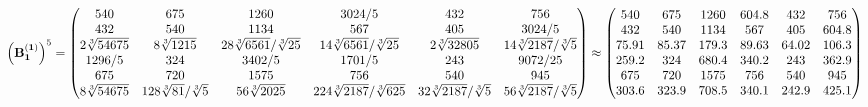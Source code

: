 \documentclass[10pt,a4paper]{article}
\begin{document}
	\[
		\left(\bold{B_1^{(1)}}\right)^{5} = 
		\begin{pmatrix}
			{{540}}{} & {{675}}{} & {{1260}}{} & {{3024}} / {{5}} & {{432}}{} & {{756}}{} \\
			{{432}}{} & {{540}}{} & {{1134}}{} & {{567}}{} & {{405}}{} & {{3024}} / {{5}} \\
			{{2}\sqrt[3]{54675}}{} & {{8}\sqrt[3]{1215}}{} & {{28}\sqrt[3]{6561}} / {\sqrt[3]{25}} & {{14}\sqrt[3]{6561}} / {\sqrt[3]{25}} & {{2}\sqrt[3]{32805}}{} & {{14}\sqrt[3]{2187}} / {\sqrt[3]{5}} \\
			{{1296}} / {{5}} & {{324}}{} & {{3402}} / {{5}} & {{1701}} / {{5}} & {{243}}{} & {{9072}} / {{25}} \\
			{{675}}{} & {{720}}{} & {{1575}}{} & {{756}}{} & {{540}}{} & {{945}}{} \\
			{{8}\sqrt[3]{54675}}{} & {{128}\sqrt[3]{81}} / {\sqrt[3]{5}} & {{56}\sqrt[3]{2025}}{} & {{224}\sqrt[3]{2187}} / {\sqrt[3]{625}} & {{32}\sqrt[3]{2187}} / {\sqrt[3]{5}} & {{56}\sqrt[3]{2187}} / {\sqrt[3]{5}} \\
		\end{pmatrix}
		\approx
		\begin{pmatrix}
			540      & 675      & 1260     & 604.8    & 432      & 756      \\
			432      & 540      & 1134     & 567      & 405      & 604.8    \\
			75.91    & 85.37    & 179.3    & 89.63    & 64.02    & 106.3    \\
			259.2    & 324      & 680.4    & 340.2    & 243      & 362.9    \\
			675      & 720      & 1575     & 756      & 540      & 945      \\
			303.6    & 323.9    & 708.5    & 340.1    & 242.9    & 425.1    \\
		\end{pmatrix}
	\]
\end{document}
